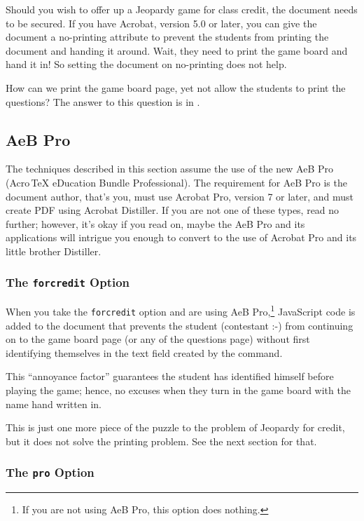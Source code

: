 \documentclass{article}
\begin{document}
Should you wish to offer up a Jeopardy game for class credit, the
document needs to be secured. If you have Acrobat, version 5.0 or
later, you can give the document a no-printing attribute to prevent
the students from printing the document and handing it around. Wait,
they need to print the game board and hand it in! So setting the
document on no-printing does not help.

How can we print the game board page, yet not allow the students
to print the questions? The answer to this question is in .

\subsection{AeB Pro}

The techniques described in this section assume the use of the new
AeB Pro (Acro\,\TeX{} eDucation Bundle Professional).  The
requirement for AeB Pro is the document author, that's you, must use
Acrobat Pro, version 7 or later, and must create PDF using Acrobat
Distiller. If you are not one of these types, read no further;
however, it's okay if you read on, maybe the AeB Pro and its
applications will intrigue you enough to convert to the use of Acrobat Pro and
its little brother Distiller.

\subsubsection{The \texttt{forcredit} Option}\label{forcreditOption}

When you take the \texttt{forcredit} option and are using AeB
Pro,\footnote{If you are not using AeB Pro, this option does
nothing.} JavaScript code is added to the document that prevents the
student (contestant :-) from continuing on to the game board page
(or any of the questions page) without first identifying themselves
in the text field created by the  command.

This ``annoyance factor'' guarantees the student has identified
himself before playing the game; hence, no excuses when they
turn in the game board with the name hand written in.

This is just one more piece of the puzzle to the problem of Jeopardy
for credit, but it does not solve the printing problem. See the next
section for that.

\subsubsection{The \texttt{pro} Option}\label{proOption}
\end{document}
